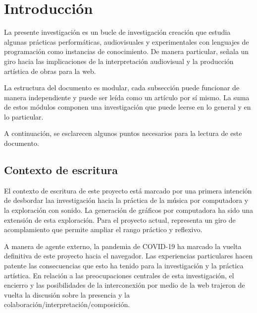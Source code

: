 



\chapter{Introducción}


La presente investigación es un bucle de investigación creación que estudia algunas prácticas performáticas, audiovisuales y experimentales con lenguajes de programación como instancias de conocimiento. De manera particular, señala un giro hacia las implicaciones de la interpretación audiovisual y la producción artística de obras para la web.

La estructura del documento es modular, cada subsección puede funcionar de manera independiente y puede ser leída como un artículo por sí mismo. La suma de estos módulos componen una investigación que puede leerse en lo general y en lo particular. 

A continuación, se esclarecen algunos puntos necesarios para la lectura de este documento. 


\section{Contexto de escritura} %

El contexto de escritura de este proyecto está marcado por una primera intención de desbordar laa investigación hacia la práctica de la música por computadora y la exploración con sonido. La generación de gráficos por computadora ha sido una extensión de esta exploración. Para el proyecto actual, representa un giro de acomplamiento que permite ampliar el rango práctico y reflexivo.

A manera de agente externo, la pandemia de COVID-19 ha marcado la vuelta definitiva de este proyecto hacia el navegador. Las experiencias particulares hacen patente las consecuencias que esto ha tenido para la investigación y la práctica artística. En relación a las preocupaciones centrales de esta investigación, el encierro y las posibilidades de la interconexión por medio de la web trajeron de vuelta la discusión sobre la presencia y la colaboración/interpretación/composición. 

